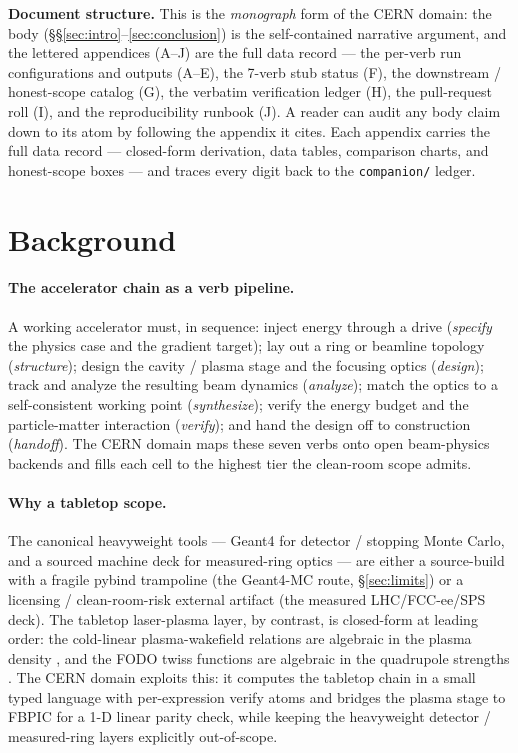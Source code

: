 \documentclass[11pt,a4paper]{article}
\begin{document}
\smallskip\noindent\textbf{Document structure.} This is the
\emph{monograph} form of the CERN domain: the body
(\S\S\ref{sec:intro}--\ref{sec:conclusion}) is the self-contained
narrative argument, and the lettered appendices (A--J) are the full data
record --- the per-verb run configurations and outputs (A--E), the
7-verb stub status (F), the downstream / honest-scope catalog (G), the
verbatim verification ledger (H), the pull-request roll (I), and the
reproducibility runbook (J). A reader can audit any body claim down to
its atom by following the appendix it cites. Each appendix carries the
full data record --- closed-form derivation, data tables, comparison
charts, and honest-scope boxes --- and traces every digit back to the
\texttt{companion/} ledger.

\section{Background}
\label{sec:bg}

\paragraph{The accelerator chain as a verb pipeline.} A working
accelerator must, in sequence: inject energy through a drive
(\emph{specify} the physics case and the gradient target); lay out a ring
or beamline topology (\emph{structure}); design the cavity / plasma stage
and the focusing optics (\emph{design}); track and analyze the resulting
beam dynamics (\emph{analyze}); match the optics to a self-consistent
working point (\emph{synthesize}); verify the energy budget and the
particle-matter interaction (\emph{verify}); and hand the design off to
construction (\emph{handoff}). The CERN domain maps these seven verbs
onto open beam-physics backends and fills each cell to the highest tier
the clean-room scope admits.

\paragraph{Why a tabletop scope.} The canonical heavyweight tools ---
Geant4 \citep{agostinelli2003geant4} for detector / stopping Monte
Carlo, and a sourced machine deck for measured-ring optics --- are either
a source-build with a fragile pybind trampoline (the Geant4-MC route,
\S\ref{sec:limits}) or a licensing / clean-room-risk external artifact
(the measured LHC/FCC-ee/SPS deck). The tabletop laser-plasma layer, by
contrast, is closed-form at leading order: the cold-linear
plasma-wakefield relations are algebraic in the plasma density
\citep{dawson1959,esarey2009lpa}, and the FODO twiss functions are
algebraic in the quadrupole strengths \citep{wiedemann2015,lee2004}. The
CERN domain exploits this: it computes the tabletop chain in a small
typed language with per-expression verify atoms and bridges the plasma
stage to FBPIC \citep{lehe2016fbpic} for a 1-D linear parity check, while
keeping the heavyweight detector / measured-ring layers explicitly
out-of-scope.
\end{document}
